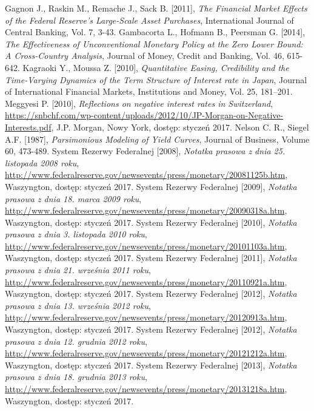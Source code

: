 \begin{thebibliography}{7}
Gagnon J., Raskin M., Remache J., Sack B. [2011],
	\emph{The Financial Market Effects of the Federal Reserve's Large-Scale Asset Purchases}, International Journal of Central Banking, Vol. 7, 3-43. 
Gambacorta L., Hofmann B., Peersman G. [2014],
	\emph{The Effectiveness of Unconventional Monetary Policy at the Zero Lower Bound: A Cross-Country Analysis}, Journal of Money, Credit and Banking, Vol. 46, 615-642. 
Kagraoki Y., Moussa Z. [2010],
	\emph{Quantitative Easing, Credibility and the Time-Varying Dynamics of the Term Structure of Interest rate in Japan},
	Journal of International Financial Markets, Institutions and Money, Vol. 25, 181–201.
Meggyesi P. [2010],
 	\emph{Reflections on negative interest rates in
Switzerland}, \url{https://snbchf.com/wp-content/uploads/2012/10/JP-Morgan-on-Negative-Interests.pdf}, J.P. Morgan, Nowy York, dostęp: styczeń 2017.		
 	Nelson C. R., Siegel A.F. [1987], 
  	\emph{Parsimonious Modeling  of  Yield  Curves}, 
  	Journal  of Business, Volume 60, 473-489.
 	System Rezerwy Federalnej [2008],
 	\emph{Notatka prasowa z dnia 25. listopada 2008 roku},
 	\url{http://www.federalreserve.gov/newsevents/press/monetary/20081125b.htm}, Waszyngton, dostęp: styczeń 2017.	
 	System Rezerwy Federalnej [2009],
 	\emph{Notatka prasowa z dnia 18. marca 2009 roku},
 	\url{http://www.federalreserve.gov/newsevents/press/monetary/20090318a.htm}, Waszyngton, dostęp: styczeń 2017.	
 	System Rezerwy Federalnej [2010],
 	\emph{Notatka prasowa z dnia 3. listopada 2010 roku},
 	\url{http://www.federalreserve.gov/newsevents/press/monetary/20101103a.htm}, Waszyngton, dostęp: styczeń 2017.	
 	System Rezerwy Federalnej [2011],
 	\emph{Notatka prasowa z dnia 21. września 2011 roku},
 	\url{http://www.federalreserve.gov/newsevents/press/monetary/20110921a.htm}, Waszyngton, dostęp: styczeń 2017.
 	System Rezerwy Federalnej [2012],
 	\emph{Notatka prasowa z dnia 13. września 2012 roku},
 	\url{http://www.federalreserve.gov/newsevents/press/monetary/20120913a.htm}, Waszyngton, dostęp: styczeń 2017.
 	System Rezerwy Federalnej [2012],
 	\emph{Notatka prasowa z dnia 12. grudnia 2012 roku},
 	\url{http://www.federalreserve.gov/newsevents/press/monetary/20121212a.htm}, Waszyngton, dostęp: styczeń 2017.
 	System Rezerwy Federalnej [2013],
 	\emph{Notatka prasowa z dnia 18. grudnia 2013 roku},
 	\url{http://www.federalreserve.gov/newsevents/press/monetary/20131218a.htm}, Waszyngton, dostęp: styczeń 2017.

\end{thebibliography}
